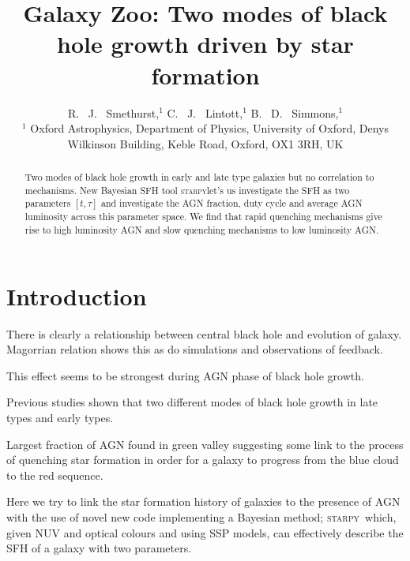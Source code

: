 \documentclass[useAMS,usenatbib]{mn2e}
\def\starpy {\textsc{starpy}}
\begin{document}
\title[AGN \& Star Formation]{Galaxy Zoo: Two modes of black hole growth driven by star formation}
\author[Smethurst et al. 2014]{R. ~J. ~Smethurst,$^{1}$ C. ~J. ~Lintott,$^{1}$ B. ~D. ~Simmons,$^{1}$
\\ $^1$ Oxford Astrophysics, Department of Physics, University of Oxford, Denys Wilkinson Building, Keble Road, Oxford, OX1 3RH, UK 
\\
}

\maketitle

\begin{abstract}
Two modes of black hole growth in early and late type galaxies but no correlation to mechanisms. New Bayesian SFH tool \starpy let's us investigate the SFH as two parameters $[t, \tau]$ and investigate the AGN fraction, duty cycle and average AGN luminosity across this parameter space. We find that rapid quenching mechanisms give rise to high luminosity AGN and slow quenching mechanisms to low luminosity AGN.\footnotemark[1]

\end{abstract}


\section{Introduction}

There is clearly a relationship between central black hole and evolution of galaxy. Magorrian relation shows this as do simulations and observations of feedback. 

This effect seems to be strongest during AGN phase of black hole growth. 

Previous studies shown that two different modes of black hole growth in late types and early types. 

Largest fraction of AGN found in green valley suggesting some link to the process of quenching star formation in order for a galaxy to progress from the blue cloud to the red sequence. 

Here we try to link the star formation history of galaxies to the presence of AGN with the use of novel new code implementing a Bayesian method; \starpy~which, given NUV and optical colours and using SSP models, can effectively describe the SFH of a galaxy with two parameters. 
\end{document}
